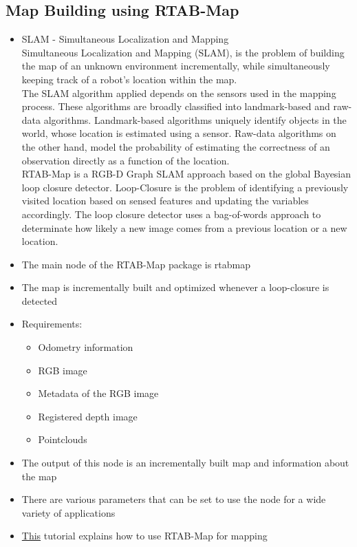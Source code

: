 \documentclass[a4paper,12pt,oneside]{book}
\begin{document}
\subsection*{Map Building using RTAB-Map}
\begin{itemize}

	\item SLAM - Simultaneous Localization and Mapping \\
	Simultaneous Localization and Mapping (SLAM), is the problem of building the map of an unknown environment incrementally, while simultaneously keeping track of a robot's location within the map. \\
	The SLAM algorithm applied depends on the sensors used in the mapping process. These algorithms are broadly classified into landmark-based and raw-data algorithms. Landmark-based algorithms uniquely identify objects in the world, whose location is estimated using a sensor. Raw-data algorithms on the other hand, model the probability of estimating the correctness of an observation directly as a function of the location. \\
	RTAB-Map is a RGB-D Graph SLAM approach based on the global Bayesian loop closure detector. Loop-Closure is the problem of identifying a previously visited location based on sensed features and updating the variables accordingly. The loop closure detector uses a bag-of-words approach to determinate how likely a new image comes from a previous location or a new location.	

	\item The main node of the RTAB-Map package is rtabmap
	\item The map is incrementally built and optimized whenever a loop-closure is detected
	\item Requirements:
		\begin{itemize}
			\item Odometry information
			\item RGB image
			\item Metadata of the RGB image
			\item Registered depth image
			\item Pointclouds
		\end{itemize}
	\item The output of this node is an incrementally built map and information about the map
	\item There are various parameters that can be set to use the node for a wide variety of applications
	\item \href{https://github.com/eYSIP-2017/eYSIP-2017_Indoor-Environments-Mapping-using-UAV/blob/master/Documents/Tutorials/Using%20RTAB-Map%20for%20mapping%20with%20Kinect.pptx}{This} tutorial explains how to use RTAB-Map for mapping

\end{itemize}
\end{document}
